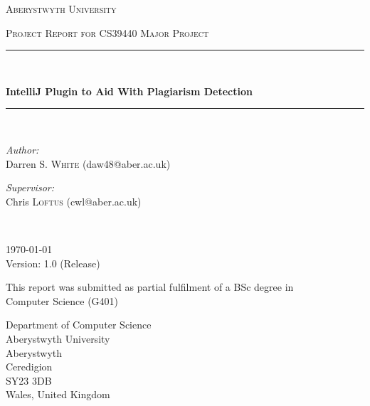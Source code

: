 
\begin{titlepage}
  \begin{center}
    \vspace*{.06\textheight}
    {\scshape\LARGE Aberystwyth University\par}\vspace{1.5cm}
    \textsc{\Large Project Report for CS39440 Major Project}\\[0.5cm]

    \rule{.9\linewidth}{.6pt} \\[0.4cm]
    {\huge \bfseries IntelliJ Plugin to Aid With Plagiarism Detection\par}\vspace{0.4cm}
    \rule{.9\linewidth}{.6pt} \\[1.5cm]

    \begin{minipage}[t]{0.45\textwidth}
    \begin{flushleft} \large
    \emph{Author:}\\
    Darren S. \textsc{White} (daw48@aber.ac.uk)
    \end{flushleft}
    \end{minipage}
    \begin{minipage}[t]{0.45\textwidth}
    \begin{flushright} \large
    \emph{Supervisor:} \\
    Chris \textsc{Loftus} (cwl@aber.ac.uk)
    \end{flushright}
    \end{minipage}\\[1cm]

    \vfill

    \large \today\\[0.3cm]
    Version: 1.0 (Release)\\[1cm]

    \vfill

    \large This report was submitted as partial fulfilment of a BSc degree in\\[0.3cm]
    Computer Science (G401)\\[2cm]

    \vfill

    \begin{minipage}[t]{\textwidth}
    \begin{flushleft} \large
    Department of Computer Science\\
    Aberystwyth University\\
    Aberystwyth\\
    Ceredigion\\
    SY23 3DB\\
    Wales, United Kingdom\\
    \end{flushleft}
    \end{minipage}

    \vfill
  \end{center}
\end{titlepage}

